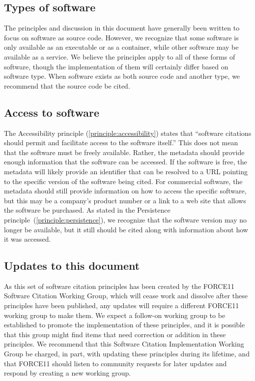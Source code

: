 \documentclass[11pt, oneside]{amsart}
\newcommand{\katznote}[1]{ {\textcolor{blue} { ***DSK: #1 }}} %
\newcommand{\LJHnote}[1]{ {\textcolor{fuschsia} { ***LJH: #1 }}} %
\begin{document}
\subsection{Types of software}

The principles and discussion in this document have generally been written to focus on software
as source code.  However, we recognize that some software is only available as an executable or as a container, while other software may be available as a service.  We believe the principles apply to all of these forms of software, though the implementation of them will certainly differ based on software type.  When software exists as both source code and another type, we recommend that the source code be cited.


\subsection{Access to software}

The Accessibility principle (\ref{principle:accessibility}) states that ``software citations should permit and facilitate access to the software itself.''
This does not mean that the software must be freely available.
Rather, the metadata should provide enough information that the software can be accessed.
If the software is free, the metadata will likely provide an identifier that can be resolved to a URL pointing to the specific version of the software being cited.
For commercial software, the metadata should still provide information on how to access the specific software, but this may be a company's product number or a link to a web site that allows the software be purchased.
As stated in the Persistence principle~(\ref{principle:persistence}), we recognize that the software version may no longer be available, but it still should be cited along with information about how it was accessed.



%

\subsection{Updates to this document}

As this set of software citation principles has been created by the FORCE11 Software Citation Working Group, which will cease work and dissolve after these principles have been published,
any updates will require a different FORCE11 working group to make them.
We expect a follow-on working group to be established to promote the implementation of
these principles, and it is possible that this group might find items that need correction or addition
in these principles.
We recommend that this Software Citation Implementation Working Group be charged, in part,
with updating these principles during its lifetime, and that FORCE11 should listen to community requests for later updates and respond by creating a new working group.
\end{document}
